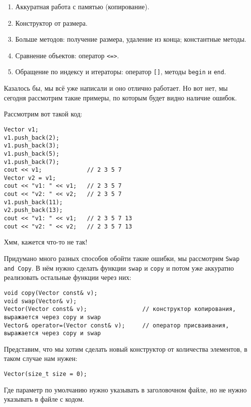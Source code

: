 \label{md2tex3}
\hyperref[md2texREADME]{\color{cyan}{К главному описанию}}


\begin{enumerate}
    \item Аккуратная работа с памятью (копирование).
    \item Конструктор от размера.
    \item Больше методов: получение размера, удаление из конца; константные методы.
    \item Сравнение объектов: оператор \texttt{<=>}.
    \item Обращение по индексу и итераторы: оператор \texttt{[]}, методы \texttt{begin} и \texttt{end}.
\end{enumerate}


Казалось бы, мы всё уже написали и оно отлично работает. Но вот нет, мы сегодня рассмотрим такие примеры, по которым будет видно наличие ошибок.

Рассмотрим вот такой код:
\begin{verbatim}
Vector v1;
v1.push_back(2);
v1.push_back(3);
v1.push_back(5);
v1.push_back(7);
cout << v1;             // 2 3 5 7
Vector v2 = v1;
cout << "v1: " << v1;   // 2 3 5 7
cout << "v2: " << v2;   // 2 3 5 7
v1.push_back(11);
v2.push_back(13);
cout << "v1: " << v1;   // 2 3 5 7 13
cout << "v2: " << v2;   // 2 3 5 7 13
\end{verbatim}
Хмм, кажется что-то не так! 

Придумано много разных способов обойти такие ошибки, мы рассмотрим \texttt{Swap and Copy}. В нём нужно сделать функции \texttt{swap} и \texttt{copy} и потом уже аккуратно реализовать остальные функции через них:
\begin{verbatim}
void copy(Vector const& v);
void swap(Vector& v);
Vector(Vector const& v);                // конструктор копирования, выражается через copy и swap
Vector& operator=(Vector const& v);     // оператор присваивания, выражается через copy и swap
\end{verbatim}


Представим, что мы хотим сделать новый конструктор от количества элементов, в таком случае нам нужен:
\begin{verbatim}
Vector(size_t size = 0);
\end{verbatim}
Где параметр по умолчанию нужно указывать в заголовочном файле, но не нужно указывать в файле с кодом.

